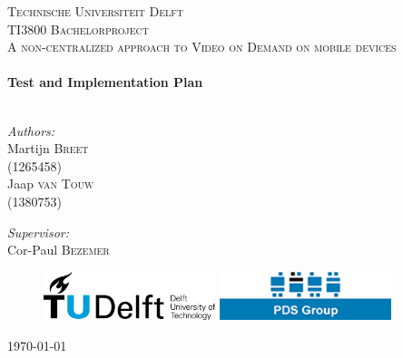\begin{titlepage}

\begin{center}



\textsc{\Large Technische Universiteit Delft }\\[1.5cm]
\textsc{\large TI3800 Bachelorproject}\\[0.5cm]
\textsc{\normalsize A non-centralized approach to Video on Demand on mobile devices}\\[0.5cm]


\HRule \\[0.4cm]
{ \huge \bfseries Test and Implementation Plan}\\[0.4cm]

\HRule \\[1.5cm]

\begin{minipage}{0.4\textwidth}
\begin{flushleft} \large
\emph{Authors:}\\
Martijn \textsc{Breet} \\ (1265458) \\ [0.1cm]
Jaap \textsc{van Touw} \\(1380753)\\ [0.1cm]
\end{flushleft}
\end{minipage}
\begin{minipage}{0.4\textwidth}
\begin{flushright} \large
\emph{Supervisor:} \\
Cor-Paul \textsc{Bezemer}
\end{flushright}
\end{minipage}
\vspace{30mm}
\begin{figure}[ht!]
\centering
\includegraphics[width=50mm]{TUDLogo.png}
\hspace{10mm}
\includegraphics[width=50mm]{pdslogo.png}
\label{overflow}
\end{figure}
\vfill

{\large \today}

\end{center}

\end{titlepage}
